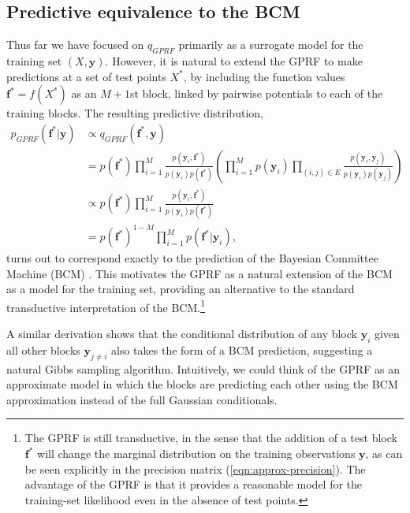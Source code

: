 \documentclass{article}
\renewcommand{\v}[1]{\mathbf{#1}}
\begin{document}

\subsection{Predictive equivalence to the BCM}
\label{sec:approx-predict}

Thus far we have focused on $q_{GPRF}$ primarily as a surrogate model
for the training set $(X, \v{y})$.  However, it is natural to extend
the GPRF to make predictions at a set of test points $X^*$, by including the
function values $\v{f}^* = f(X^*)$ as an $M+1$st block, linked by
pairwise potentials to each of the training blocks. The resulting
predictive distribution,
\begin{align}
p_{GPRF}(\v{f}^* | \v{y}) &\propto q_{GPRF}(\v{f}^*, \v{y}) \\
&= p(\v{f}^*) \prod_{i=1}^M \frac{p(\v{y}_i,
  \v{f}^*)}{p(\v{y}_i) p(\v{f}^*)} \left(\prod_{i=1}^M p(\v{y}_i) \prod_{(i,j)\in E} \frac{p(\v{y}_i, \v{y}_j)}{p(\v{y}_i)
    p(\v{y}_j)}\right)  \\
&\propto p(\v{f}^*) \prod_{i=1}^M \frac{p(\v{y}_i,
  \v{f}^*)}{p(\v{y}_i) p(\v{f}^*)}\\
&=p(\v{f}^*)^{1-M} \prod_{i=1}^M p(\v{f}^* | \v{y}_i),
\end{align}
turns out to correspond exactly to the prediction of 
the Bayesian Committee Machine (BCM) \citep{tresp2000bayesian}. This motivates the
GPRF as a natural extension of the BCM as a model for the training
set, providing an alternative to the standard transductive
interpretation of the BCM.\footnote{The GPRF is still transductive, in
  the sense that the addition of a test block $\v{f^*}$ will change the
  marginal distribution on the training observations $\v{y}$, as 
  can be seen explicitly in the precision matrix (\ref{eqn:approx-precision}). The
  advantage of the GPRF is that it provides a reasonable model for
  the training-set likelihood even in the absence of test
  points. }

A similar derivation shows that the conditional distribution of any
block $\v{y}_i$ given all other blocks $\v{y}_{j\ne i}$ also takes the
form of a BCM prediction, suggesting a natural Gibbs sampling
algorithm. Intuitively, we could think of the GPRF as an approximate
model in which the blocks are predicting each other using the BCM
approximation instead of the full Gaussian conditionals. 
\end{document}
